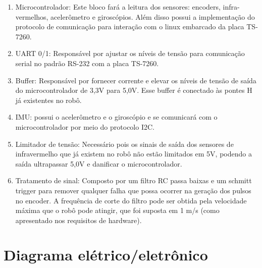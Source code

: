 \begin{enumerate}[topsep=0pt, partopsep=0pt, itemsep=0pt]
    \item Microcontrolador: Este bloco fará a leitura dos sensores: encoders, infra-vermelhos, acelerômetro e giroscópios. Além disso possui a implementação do protocolo de comunicação para interação com o linux embarcado da placa TS-7260.
    \item UART 0/1: Responsável por ajustar os níveis de tensão para comunicação serial no padrão RS-232 com a placa TS-7260.
    \item Buffer: Responsável por fornecer corrente e elevar os níveis de tensão de saída do microcontrolador de 3,3V para 5,0V. Esse buffer é conectado às pontes H já existentes no robô.
    \item IMU: possui o acelerômetro e o giroscópio e se comunicará com o microcontrolador por meio do protocolo I2C.
    \item Limitador de tensão: Necessário pois os sinais de saída dos sensores de infravermelho que já existem no robô não estão limitados em 5V, podendo a saída ultrapassar 5,0V e danificar o microcontrolador. 
    \item Tratamento de sinal: Composto por um filtro RC passa baixas e um schmitt trigger para remover qualquer falha que possa ocorrer na geração dos pulsos no encoder. A frequência de corte do filtro pode ser obtida pela velocidade máxima que o robô pode atingir, que foi suposta em 1 m/s (como apresentado nos requisitos de hardware).
\end{enumerate}

\section{Diagrama elétrico/eletrônico}

